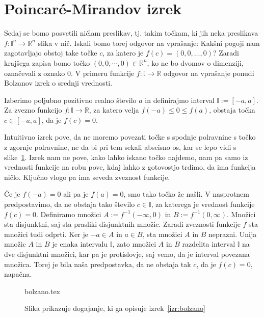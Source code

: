 \documentclass[mat1]{fmfdelo}
\newcommand{\R}{\mathbb R}
\newcommand{\I}{\mathbb I}
\newcommand{\0}{0}
\begin{document}
\section{Poincar\'e-Mirandov izrek}\label{raz:PM}
Sedaj se bomo posvetili ničlam preslikav, tj. takim točkam, ki jih neka preslikava $f : \I^n \to \R^n$ slika v nič. Iskali bomo torej odgovor na vprašanje: Kakšni pogoji nam zagotavljajo obstoj take točke $c$, za katero je $f(c) = (0, 0, \dots, 0)$? Zaradi krajšega zapisa bomo točko $(0, 0, \cdots, 0) \in \R^n$, ko ne bo dvomov o dimenziji, označevali z oznako $\0$. V primeru funkcije $f : \I \to \R$ odgovor na vprašanje ponudi Bolzanov izrek o srednji vrednosti.
\begin{izrek}\label{izr:bolzano}
Izberimo poljubno pozitivno realno število $a$ in definirajmo interval $\I := [-a, a]$. Za zvezno funkcijo $f : \I \to \R$, za katero velja $f(-a) \leq 0 \leq f(a)$, obstaja točka $c \in [-a, a]$, da je $f(c) = 0$.
\end{izrek}
Intuitivno izrek pove, da ne moremo povezati točke s spodnje polravnine s točko z zgornje polravnine, ne da bi pri tem sekali abscisno os, kar se lepo vidi s slike~\ref{fig:bolzano}. Izrek nam ne pove, kako lahko iskano točko najdemo, nam pa samo iz vrednosti funkcije na robu pove, kdaj lahko z gotovostjo trdimo, da ima funkcija ničlo. Ključno vlogo pa ima seveda zveznost funkcije.
\begin{dokaz}
Če je $f(-a) = 0$ ali pa je $f(a) = 0$, smo tako točko že našli. V nasprotnem predpostavimo, da ne obstaja tako število $c \in \I$, za katerega je vrednost funkcije $f(c) = 0$. Definiramo množici $A := f^{-1}(- \infty, 0)$ in $B := f^{-1}(0, \infty)$. Množici sta disjunktni, saj sta prasliki disjunktnih množic. Zaradi zveznosti funkcije $f$ sta množici tudi odprti. Ker je $-a \in A$ in $a \in B$, sta množici $A$ in $B$ neprazni. Unija množic $A$ in $B$ je enaka intervalu $\I$, zato množici $A$ in $B$ razdelita interval $\I$ na dve disjunktni množici, kar pa je protislovje, saj vemo, da je interval povezana množica. Torej je bila naša predpostavka, da ne obstaja tak $c$, da je $f(c) = 0$, napačna.
\end{dokaz}
\begin{figure}[h!]
	\centering
	{bolzano.tex}
	\caption{Slika prikazuje dogajanje, ki ga opisuje izrek~\ref{izr:bolzano}}\label{fig:bolzano}
\end{figure}
\end{document}
